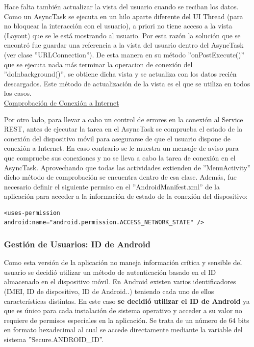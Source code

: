 	Hace falta también actualizar la vista del usuario cuando se reciban los datos. Como un AsyncTask se ejecuta en un hilo aparte diferente del UI Thread (para no bloquear la interacción con el usuario), a priori no tiene acceso a la vista (Layout) que se le está mostrando al usuario. Por esta razón la solución que se encontró fue guardar una referencia a la vista del usuario dentro del AsyncTask (ver clase ''URLConnection''). De esta manera en su método ''onPostExecute()'' que se ejecuta nada más terminar la operacion de conexión del ''doInbackground()'', se obtiene dicha vista y se actualiza con los datos recién descargados. Este método de actualización de la vista es el que se utiliza en todos los casos. \\
		
		\underline{Comprobación de Conexión a Internet}
		
		Por otro lado, para llevar a cabo un control de errores en la conexión al Service REST, antes de ejecutar la tarea en el AsyncTask se comprueba el estado de la conexión del dispositivo móvil para asegurarse de que el usuario dispone de conexión a Internet. En caso contrario se le muestra un mensaje de aviso para que compruebe sus conexiones y no se lleva a cabo la tarea de conexión en el AsyncTask. Aprovechando que todas las actividades extienden de ''MenuActivity'' dicho método de comprobación se encuentra dentro de esa clase. Además, fue necesario definir el siguiente permiso en el ''AndroidManifest.xml'' de la aplicación para acceder a la información de estado de la conexión del dispositivo:
		
		  \lstset{language=XML, breaklines=true, autogobble=true, basicstyle=\ttfamily\footnotesize}
	  \begin{lstlisting}[frame=single]
	  <uses-permission android:name="android.permission.ACCESS_NETWORK_STATE" />
	  \end{lstlisting}
		
	\subsubsection{Gestión de Usuarios: ID de Android} \label{sssec:idUser}
	
		Como esta versión de la aplicación no maneja información crítica y sensible del usuario se decidió utilizar un método de autenticación basado en el ID almacenado en el dispositivo móvil. En Android existen varios identificadores (IMEI, ID de dispositivo, ID de Android..) teniendo cada uno de ellos características distintas. En este caso \textbf{se decidió utilizar el ID de Android} \cite{ref:android_secure} ya que es único para cada instalación de sistema operativo y acceder a su valor no requiere de permisos especiales en la aplicación. Se trata de un número de 64 bits en formato hexadecimal al cual se accede directamente mediante la variable del sistema ''Secure.ANDROID\_ID''.
		

